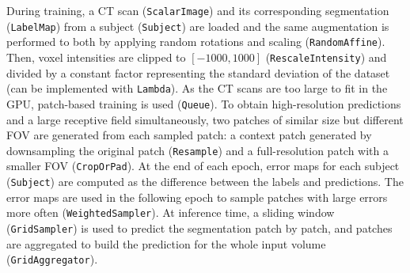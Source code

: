 During training, a CT scan (\texttt{ScalarImage}) and its corresponding segmentation (\texttt{LabelMap}) from a subject (\texttt{Subject}) are loaded and the same augmentation is performed to both by applying random rotations and scaling (\texttt{RandomAffine}).
Then, voxel intensities are clipped to $[-1000, 1000]$ (\texttt{RescaleIntensity}) and divided by a constant factor representing the standard deviation of the dataset (can be implemented with \texttt{Lambda}).
As the \ac{CT} scans are too large to fit in the \ac{GPU}, patch-based training is used (\texttt{Queue}).
To obtain high-resolution predictions and a large receptive field simultaneously, two patches of similar size but different \ac{FOV} are generated from each sampled patch: a context patch generated by downsampling the original patch (\texttt{Resample}) and a full-resolution patch with a smaller \ac{FOV} (\texttt{CropOrPad}).
At the end of each epoch, error maps for each subject (\texttt{Subject}) are computed as the difference between the labels and predictions.
The error maps are used in the following epoch to sample patches with large errors more often (\texttt{WeightedSampler}).
At inference time, a sliding window (\texttt{GridSampler}) is used to predict the segmentation patch by patch, and patches are aggregated to build the prediction for the whole input volume (\texttt{GridAggregator}).
